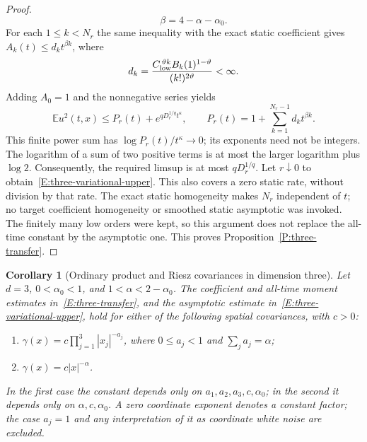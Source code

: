 \documentclass[12pt]{article}
\numberwithin{equation}{section}
\newtheorem{corollary}[theorem]{Corollary}
\theoremstyle{definition}
\newcommand{\E}{\mathbb{E}}
\begin{document}
\begin{proof}
\[    \qquad \beta=4-\alpha-\alpha_0.
  \]
  For each $1\le k<N_r$ the same inequality with the exact static
  coefficient gives $A_k(t)\le d_kt^{\beta k}$, where
  \[
    d_k=\frac{C_{\rm low}^{\,\vartheta k}
    B_k(1)^{1-\vartheta}}{(k!)^{2\vartheta}}<\infty.
  \]
  Adding $A_0=1$ and the nonnegative series yields
  \[
    \E u^2(t,x)\le P_r(t)+e^{qD_r^{1/q}t^\kappa},\qquad
    P_r(t)=1+\sum_{k=1}^{N_r-1}d_kt^{\beta k}.
  \]
  This finite power sum has $\log P_r(t)/t^\kappa\to0$; its
  exponents need not be integers. The logarithm of a sum of two
  positive terms is at most the larger logarithm plus $\log2$.
  Consequently, the required limsup is at most $qD_r^{1/q}$.
  Let $r\downarrow0$ to obtain~\eqref{E:three-variational-upper}.
  This also covers a zero static rate, without division by that rate.
  The exact static homogeneity makes $N_r$ independent of $t$;
  no target coefficient homogeneity or smoothed static asymptotic was
  invoked. The finitely many low orders were kept, so this argument
  does not replace the all-time constant by the asymptotic one.
  This proves Proposition~\ref{P:three-transfer}.
\end{proof}

\begin{corollary}[Ordinary product and Riesz covariances in dimension three]
  \label{C:three-product-riesz}
  Let $d=3$, $0<\alpha_0<1$, and $1<\alpha<2-\alpha_0$.
  The coefficient and all-time moment estimates in~\eqref{E:three-transfer},
  and the asymptotic estimate in~\eqref{E:three-variational-upper}, hold
  for either of the following spatial covariances, with $c>0$:
  \begin{enumerate}
    \item $\gamma(x)=c\prod_{j=1}^3|x_j|^{-a_j}$, where
      $0\le a_j<1$ and $\sum_j a_j=\alpha$;
    \item $\gamma(x)=c|x|^{-\alpha}$.
  \end{enumerate}
  In the first case the constant depends only on $a_1,a_2,a_3,c,\alpha_0$;
  in the second it depends only on $\alpha,c,\alpha_0$.
  A zero coordinate exponent denotes a constant factor; the case $a_j=1$
  and any interpretation of it as coordinate white noise are excluded.
\end{corollary}
\end{document}
